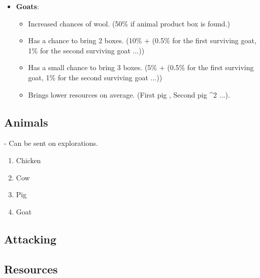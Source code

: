 \documentclass[12pt]{article}
\begin{document}
\begin{itemize}
\item \textbf{Goats}:
\begin{itemize}
    \item Increased chances of wool.
    (50\% if animal product box is found.)
    \item Has a chance to bring 2 boxes.
    (10\% + (0.5\% for the first surviving goat, 1\% for the second surviving goat ...))
    \item Has a small chance to bring 3 boxes.
    (5\% + (0.5\% for the first surviving goat, 1\% for the second surviving goat ...))
    \item Brings lower resources on average.
    (First pig , Second pig ^2 ...).
\end{itemize}
\end{itemize}


\subsection{Animals}
- Can be sent on explorations.
\begin{enumerate}
    \item Chicken
    \item Cow
    \item Pig
    \item Goat
\end{enumerate}

\subsection{Attacking}






\subsection{Resources}
\end{document}
